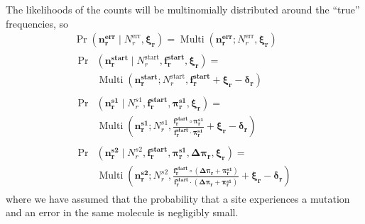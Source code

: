 \documentclass[twocolumn]{bmcart}%
\begin{document}
The likelihoods of the counts will be multinomially distributed around the ``true'' frequencies, so 
\begin{gather}
\label{eq:pr_nrerr}
\Pr\left(\mathbf{n_r^{\textbf{err}}}\mid N_r^{\textrm{err}}, \boldsymbol{\mathbf{\xi_r}}\right) = \operatorname{Multi}\left(\mathbf{n_r^{\textbf{err}}}; N_r^{\textrm{err}}, \boldsymbol{\mathbf{\xi_r}}\right) \\
\label{eq:pr_nrstart}
\begin{split}
\Pr&\left(\mathbf{n_r^{\textbf{start}}}\mid N_r^{\textrm{start}}, \boldsymbol{\mathbf{f_r^{\textbf{start}}}}, \boldsymbol{\mathbf{\xi_r}}\right) = \\ & \operatorname{Multi}\left(\mathbf{n_r^{\textbf{start}}}; N_r^{\textrm{start}}, \boldsymbol{\mathbf{f_r^{\textbf{start}}}} + \boldsymbol{\mathbf{\xi_r}}- \boldsymbol{\mathbf{\delta_r}}\right) \end{split} \\
\label{eq:pr_nrs1}
\begin{split}
\Pr&\left(\mathbf{n_r^{s1}}\mid N_r^{s1}, \boldsymbol{\mathbf{f_r^{\textbf{start}}}}, \boldsymbol{\mathbf{\pi_r^{s1}}}, \boldsymbol{\mathbf{\xi_r}}\right) = \\ & \operatorname{Multi}\left(\mathbf{n_r^{s1}}; N_r^{s1}, \frac{\boldsymbol{\mathbf{f_r^{\textbf{start}}}}\circ \boldsymbol{\mathbf{\pi_r^{s1}}}}{\boldsymbol{\mathbf{f_r^{\textbf{start}}}}\cdot \boldsymbol{\mathbf{\pi_r^{s1}}}} + \boldsymbol{\mathbf{\xi_r}}- \boldsymbol{\mathbf{\delta_r}}\right) \end{split} \\
\label{eq:pr_nrs2}
\begin{split} \Pr&\left(\mathbf{n_r^{s2}}\mid N_r^{s2}, \boldsymbol{\mathbf{f_r^{\textbf{start}}}}, \boldsymbol{\mathbf{\pi_r^{s1}}}, \boldsymbol{\mathbf{\Delta\pi_r}}, \boldsymbol{\mathbf{\xi_r}}\right) = \\ & \operatorname{Multi}\left(\mathbf{n_r^{s2}}; N_r^{s2}, \frac{\boldsymbol{\mathbf{f_r^{\textbf{start}}}}\circ \left(\boldsymbol{\mathbf{\Delta\pi_r}} + \boldsymbol{\mathbf{\pi_r^{s1}}}\right)}{\boldsymbol{\mathbf{f_r^{\textbf{start}}}}\cdot \left(\boldsymbol{\mathbf{\Delta\pi_r}} + \boldsymbol{\mathbf{\pi_r^{s1}}}\right)} + \boldsymbol{\mathbf{\xi_r}}- \boldsymbol{\mathbf{\delta_r}}\right) \end{split}
\end{gather}
where we have assumed that the probability that a site experiences a mutation and an error in the same molecule is negligibly small.
\end{document}
